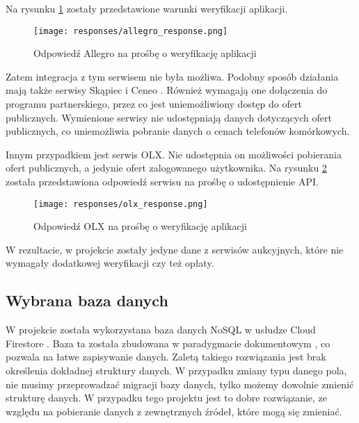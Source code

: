 Na rysunku \ref*{allegro_verification} zostały przedstawione warunki weryfikacji aplikacji.

\begin{figure}[H]
    \centering
    \texttt{[image: responses/allegro\_response.png]}
    \caption{Odpowiedź Allegro na prośbę o weryfikację aplikacji}
    \label{allegro_verification}
\end{figure}

Zatem integracja z tym serwisem nie była możliwa. Podobny sposób działania mają także serwisy Skąpiec \cite{skapiec} i Ceneo \cite{ceneo}. Również wymagają one dołączenia do programu partnerskiego, przez co jest uniemożliwiony dostęp do ofert publicznych. Wymienione serwisy nie udostępniają danych dotyczących ofert publicznych, co uniemożliwia pobranie danych o cenach telefonów komórkowych.

Innym przypadkiem jest serwis OLX. Nie udostępnia on możliwości pobierania ofert publicznych, a jedynie ofert zalogowanego użytkownika. Na rysunku \ref*{olx_response} została przedstawiona odpowiedź serwisu na prośbę o udostępnienie API.

\begin{figure}[H]
    \centering
    \texttt{[image: responses/olx\_response.png]}
    \caption{Odpowiedź OLX na prośbę o weryfikację aplikacji}
    \label{olx_response}
\end{figure}

W rezultacie, w projekcie zostały jedyne dane z serwisów aukcyjnych, które nie wymagały dodatkowej weryfikacji czy też opłaty.

\subsection{Wybrana baza danych}
W projekcie została wykorzystana baza danych NoSQL \cite{NoSQL} w usłudze Cloud Firestore \cite{firestore}. Baza ta została zbudowana w paradygmacie dokumentowym \cite{document_based_database}, co pozwala na łatwe zapisywanie danych. Zaletą takiego rozwiązania jest brak określenia dokładnej struktury danych. W przypadku zmiany typu danego pola, nie musimy przeprowadzać migracji bazy danych, tylko możemy dowolnie zmienić strukturę danych. W przypadku tego projektu jest to dobre rozwiązanie, ze względu na pobieranie danych z zewnętrznych źródeł, które mogą się zmieniać.

